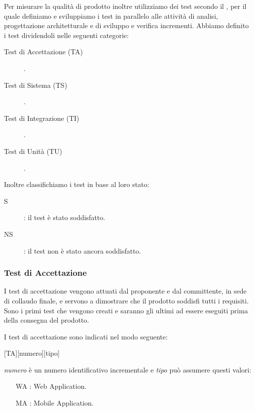 \documentclass[../piano-di-qualifica.tex]{subfiles}
\begin{document}
Per misurare la qualità di prodotto inoltre utilizziamo dei test secondo il , per il quale definiamo e sviluppiamo i test in parallelo alle attività di analisi, progettazione architetturale e di sviluppo e verifica incrementi.
Abbiamo definito i test dividendoli nelle seguenti categorie:
\begin{description}
  \item [Test di Accettazione (TA)].
  \item [Test di Sistema (TS)].
  \item [Test di Integrazione (TI)].
  \item [Test di Unità (TU)].
\end{description}

Inoltre classifichiamo i test in base al loro stato:
\begin{description}
  \item [S]: il test è stato soddisfatto.
  \item [NS]: il test non è stato ancora soddisfatto.
\end{description}

\subsubsection{Test di Accettazione}%
\label{subs:test_di_accettazione}

I test di accettazione vengono attuati dal proponente e dal committente, in sede di collaudo finale, e servono a dimostrare che il prodotto soddisfi tutti i requisiti.
Sono i primi test che vengono creati e saranno gli ultimi ad essere eseguiti prima della consegna del prodotto.

I test di accettazione sono indicati nel modo seguente:
\begin{center}
  [TA][numero][tipo]
\end{center}
\textit{numero} è un numero identificativo incrementale e \textit{tipo} può assumere questi valori:
\begin{itemize}
  \item [WA]: Web Application.
  \item [MA]: Mobile Application.
\end{itemize}
\end{document}
